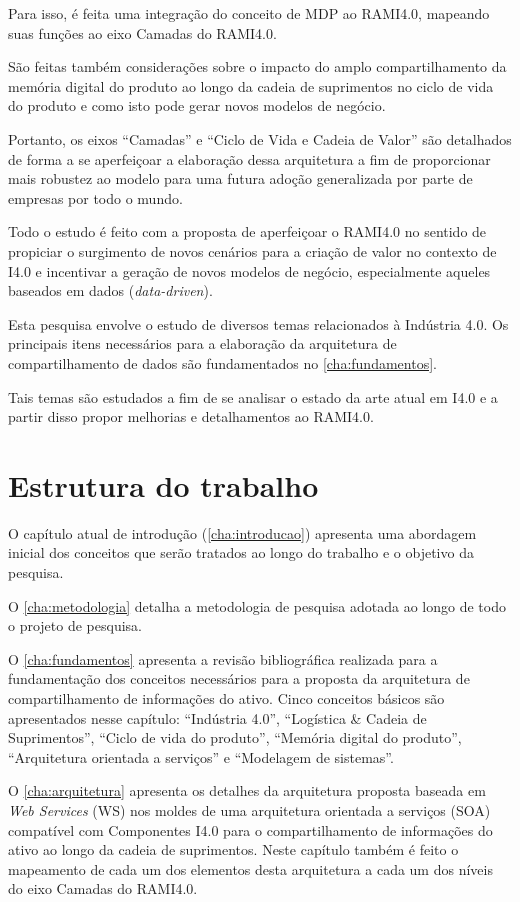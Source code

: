 Para isso, é feita uma integração do conceito de MDP ao RAMI4.0, mapeando suas funções ao eixo Camadas do RAMI4.0.

São feitas também considerações sobre o impacto do amplo compartilhamento da memória digital do produto ao longo da cadeia de suprimentos no ciclo de vida do produto e como isto pode gerar novos modelos de negócio.

Portanto, os eixos ``Camadas'' e ``Ciclo de Vida e Cadeia de Valor'' são detalhados de forma a se aperfeiçoar a elaboração dessa arquitetura a fim de proporcionar mais robustez ao modelo para uma futura adoção generalizada por parte de empresas por todo o mundo.

Todo o estudo é feito com a proposta de aperfeiçoar o RAMI4.0 no sentido de propiciar o surgimento de novos cenários para a criação de valor no contexto de I4.0 e incentivar a geração de novos modelos de negócio, especialmente aqueles baseados em dados (\textit{data-driven}).

Esta pesquisa envolve o estudo de diversos temas relacionados à Indústria 4.0. Os principais itens necessários para a elaboração da arquitetura de compartilhamento de dados são fundamentados no \autoref{cha:fundamentos}.

Tais temas são estudados a fim de se analisar o estado da arte atual em I4.0 e a partir disso propor melhorias e detalhamentos ao RAMI4.0.

\section{Estrutura do trabalho}

O capítulo atual de introdução (\autoref{cha:introducao}) apresenta uma abordagem inicial dos conceitos que serão tratados ao longo do trabalho e o objetivo da pesquisa.

O \autoref{cha:metodologia} detalha a metodologia de pesquisa adotada ao longo de todo o projeto de pesquisa.

O \autoref{cha:fundamentos} apresenta a revisão bibliográfica realizada para a fundamentação dos conceitos necessários para a proposta da arquitetura de compartilhamento de informações do ativo. Cinco conceitos básicos são apresentados nesse capítulo: ``Indústria 4.0'', ``Logística \& Cadeia de Suprimentos'', ``Ciclo de vida do produto'', ``Memória digital do produto'', ``Arquitetura orientada a serviços'' e ``Modelagem de sistemas''.

O \autoref{cha:arquitetura} apresenta os detalhes da arquitetura proposta baseada em \textit{Web Services} (WS) nos moldes de uma arquitetura orientada a serviços (SOA) compatível com Componentes I4.0 para o compartilhamento de informações do ativo ao longo da cadeia de suprimentos. Neste capítulo também é feito o mapeamento de cada um dos elementos desta arquitetura a cada um dos níveis do eixo Camadas do RAMI4.0.


